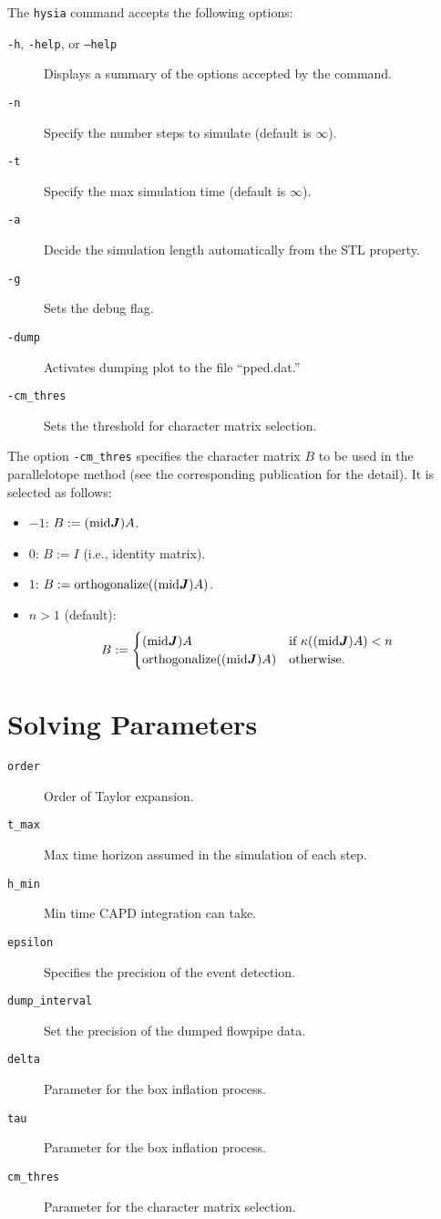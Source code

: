 \documentclass[10pt,a4paper]{article}
\begin{document}
The \texttt{hysia} command accepts the following options:
\begin{description}
\item[\texttt{-h}, \texttt{-help}, or \texttt{--help}] Displays a summary of the options accepted by the command.
\item[\texttt{-n}] Specify the number steps to simulate (default is $\infty$).
\item[\texttt{-t}] Specify the max simulation time (default is $\infty$).
\item[\texttt{-a}] Decide the simulation length automatically from the STL property.
\item[\texttt{-g}] Sets the debug flag.
\item[\texttt{-dump}] Activates dumping plot to the file ``pped.dat.''
\item[\texttt{-cm_thres}] Sets the threshold for character matrix selection.
\end{description}

The option \texttt{-cm_thres} specifies the character matrix $B$ to be used in the parallelotope method (see the corresponding publication for the detail). It is selected as follows:
\begin{itemize}
	\item $-1$: $B := (\mathrm{mid}\J) A$.
	\item $0$: $B := I$ (i.e., identity matrix).
	\item $1$: $B := \mathrm{orthogonalize}((\mathrm{mid}\J) A)$.
	\item $n > 1$ (default): 
		\[
			B := \begin{cases}
				(\mathrm{mid}\J) A & \text{if $\kappa((\mathrm{mid}\J) A) < n$} \\
				\mathrm{orthogonalize}((\mathrm{mid}\J) A) & \text{otherwise.}
			\end{cases}
		\]
\end{itemize}


\section{Solving Parameters}

\begin{description}
\item[\texttt{order}] Order of Taylor expansion.
\item[\texttt{t_max}] Max time horizon assumed in the simulation of each step.
\item[\texttt{h_min}] Min time CAPD integration can take.
\item[\texttt{epsilon}] Specifies the precision of the event detection.
\item[\texttt{dump_interval}] Set the precision of the dumped flowpipe data.
\item[\texttt{delta}] Parameter for the box inflation process.
\item[\texttt{tau}] Parameter for the box inflation process.
\item[\texttt{cm_thres}] Parameter for the character matrix selection.
\end{description}
\end{document}
